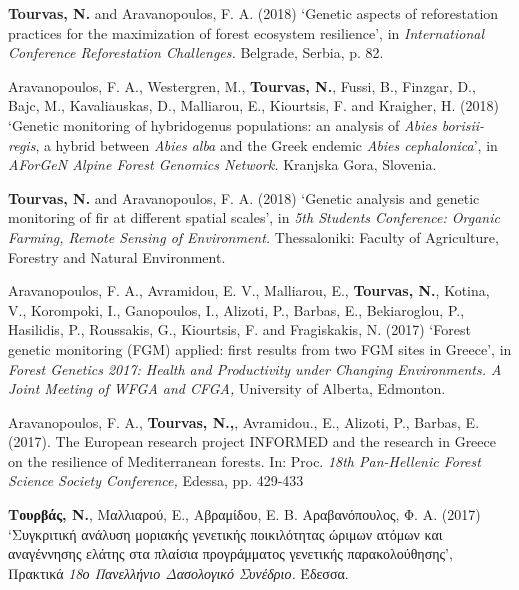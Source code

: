 \documentclass[12pt,]{scrartcl}
\begin{document}
\vspace{-3mm}
\begin{enumerate}
\leftskip-0.13in
	\setcounter{enumi}{2}
	
\leftskip-0.07in  

\leftskip-0.07in  
\item {\textbf{Tourvas, N.} and Aravanopoulos, F. A. (2018) ‘Genetic aspects of reforestation practices for the maximization of forest ecosystem resilience’, in \textit{International Conference Reforestation Challenges.} Belgrade, Serbia, p. 82.}

\leftskip-0.07in  
\item {Aravanopoulos, F. A., Westergren, M., \textbf{Tourvas, N.}, Fussi, B., Finzgar, D., Bajc, M., Kavaliauskas, D., Malliarou, E., Kiourtsis, F. and Kraigher, H. (2018) ‘Genetic monitoring of hybridogenus populations: an analysis of \textit{Abies borisii-regis}, a hybrid between \textit{Abies alba }and the Greek endemic \textit{Abies cephalonica}’, in \textit{AForGeN Alpine Forest Genomics Network.} Kranjska Gora, Slovenia.}

\item {\textbf{Tourvas, N.} and Aravanopoulos, F. A. (2018) ‘Genetic analysis and genetic monitoring of fir at different spatial scales’, in \textit{5th Students Conference: Organic Farming, Remote Sensing of Environment.} Thessaloniki: Faculty of Agriculture, Forestry and Natural Environment.

\leftskip-0.07in  
\item {Aravanopoulos, F. A., Avramidou, E. V., Malliarou, E., \textbf{Tourvas, N.}, Kotina, V., Korompoki, I., Ganopoulos, I., Alizoti, P., Barbas, E., Bekiaroglou, P., Hasilidis, P., Roussakis, G., Kiourtsis, F. and Fragiskakis, N. (2017) ‘Forest genetic monitoring (FGM) applied: first results from two FGM sites in Greece’, in \textit{Forest Genetics 2017: Health and Productivity under Changing Environments. A Joint Meeting of WFGA and CFGA,} University of Alberta, Edmonton.}

\leftskip-0.07in  
\item {Aravanopoulos, F. Α., \textbf{Tourvas, N.,}, Avramidou., E., Alizoti, P., Barbas, E. (2017). The European research project INFORMED and the research in Greece on the resilience of Mediterranean forests. In: Proc. \textit{18th Pan-Hellenic Forest Science Society Conference,} Edessa, pp. 429-433}
 
\leftskip-0.07in  
\item {\textbf{Τουρβάς, Ν.}, Μαλλιαρού, E., Αβραμίδου, Ε. Β. Αραβανόπουλος, Φ. Α. (2017) ‘Συγκριτική ανάλυση μοριακής γενετικής ποικιλότητας ώριμων ατόμων και αναγέννησης ελάτης στα πλαίσια προγράμματος γενετικής παρακολούθησης’, Πρακτικά \textit{18ο Πανελλήνιο Δασολογικό Συνέδριο.} Έδεσσα.}

}
\end{enumerate}
\end{document}
